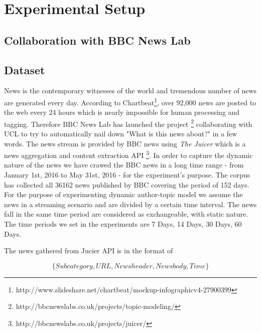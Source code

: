 \chapter{Experimental Setup}
\label{chapterlabel4}

\section{Collaboration with BBC News Lab}
\section{Dataset}
News is the contemporary witnesses of the world and tremendous number of news are generated every day. According to Chartbeat\footnote{http://www.slideshare.net/chartbeat/mockup-infographicv4-27900399}, over 92,000 news are posted to the web every 24 hours which is nearly impossible for human processing and tagging. Therefore BBC News Lab has launched the project \footnote{http://bbcnewslabs.co.uk/projects/topic-modeling/} collaborating with UCL to try to automatically nail down "What is this news about?" in a few words. 
The news stream is provided by BBC news using \textit{The Juicer} which is a news aggregation and content extraction API \footnote{http://bbcnewslabs.co.uk/projects/juicer/}. In order to capture the dynamic nature of the news we have crawed the BBC news in a long time range - from January 1st, 2016 to May 31st, 2016 - for the experiment's purpose.
The corpus has collected all 36162 news published by BBC covering the period of 152 days. For the purpose of experimenting dynamic author-topic model we assume the news in a streaming scenario and are divided by a certain time interval. The news fall in the same time period are considered as exchangeable, with static nature. The time periods we set in the experiments are {7 Days, 14 Days, 30 Days, 60 Days}.

The news gathered from Jucier API is in the format of 

\begin{equation}
\{Subcategory, URL, News header, News body, Time\}
\end{equation}


